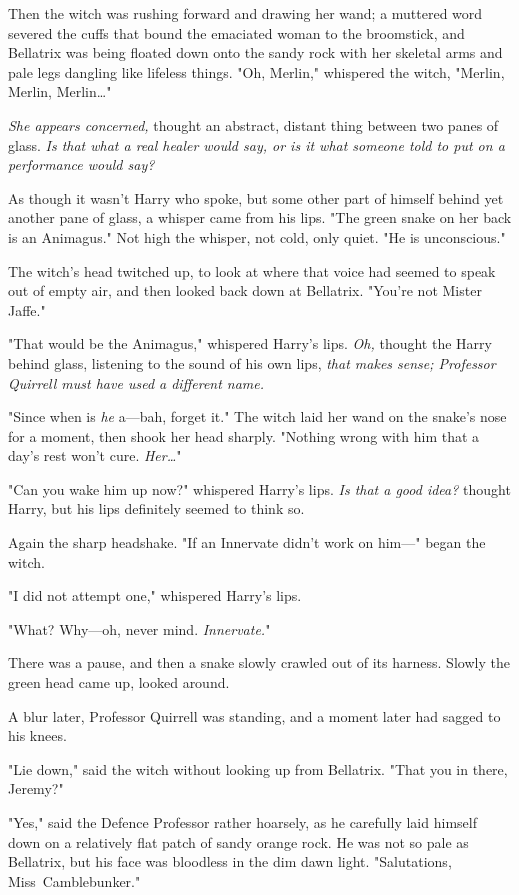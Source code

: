 Then the witch was rushing forward and drawing her wand; a muttered word
severed the cuffs that bound the emaciated woman to the broomstick, and
Bellatrix was being floated down onto the sandy rock with her skeletal arms and
pale legs dangling like lifeless things. "Oh, Merlin," whispered the witch,
"Merlin, Merlin, Merlin{\ldots}"

\emph{She appears concerned,} thought an abstract, distant thing between two
panes of glass. \emph{Is that what a real healer would say, or is it what
someone told to put on a performance would say?}

As though it wasn't Harry who spoke, but some other part of himself behind yet
another pane of glass, a whisper came from his lips. "The green snake on her
back is an Animagus." Not high the whisper, not cold, only quiet. "He is
unconscious."

The witch's head twitched up, to look at where that voice had seemed to speak
out of empty air, and then looked back down at Bellatrix. "You're not Mister
Jaffe."

"That would be the Animagus," whispered Harry's lips. \emph{Oh,} thought the
Harry behind glass, listening to the sound of his own lips, \emph{that makes
sense; Professor Quirrell must have used a different name.}

"Since when is \emph{he} a---bah, forget it." The witch laid her wand on the
snake's nose for a moment, then shook her head sharply. "Nothing wrong with him
that a day's rest won't cure. \emph{Her{\ldots}}"

"Can you wake him up now?" whispered Harry's lips. \emph{Is that a good idea?}
thought Harry, but his lips definitely seemed to think so.

Again the sharp headshake. "If an Innervate didn't work on him---" began the
witch.

"I did not attempt one," whispered Harry's lips.

"What? Why---oh, never mind. \emph{Innervate.}"

There was a pause, and then a snake slowly crawled out of its harness. Slowly
the green head came up, looked around.

A blur later, Professor Quirrell was standing, and a moment later had sagged to
his knees.

"Lie down," said the witch without looking up from Bellatrix. "That you in
there, Jeremy?"

"Yes," said the Defence Professor rather hoarsely, as he carefully laid himself
down on a relatively flat patch of sandy orange rock. He was not so pale as
Bellatrix, but his face was bloodless in the dim dawn light. "Salutations,
Miss~Camblebunker."

